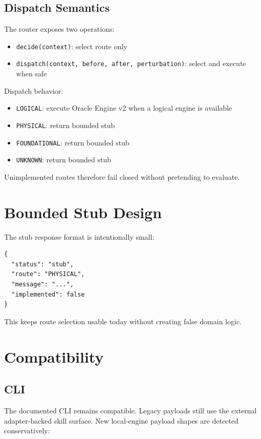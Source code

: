 \documentclass[11pt]{article}
\begin{document}
\subsection{Dispatch Semantics}

The router exposes two operations:

\begin{itemize}
\item \texttt{decide(context)}: select route only
\item \texttt{dispatch(context, before, after, perturbation)}: select and execute when safe
\end{itemize}

Dispatch behavior:

\begin{itemize}
\item \texttt{LOGICAL}: execute Oracle Engine v2 when a logical engine is available
\item \texttt{PHYSICAL}: return bounded stub
\item \texttt{FOUNDATIONAL}: return bounded stub
\item \texttt{UNKNOWN}: return bounded stub
\end{itemize}

Unimplemented routes therefore fail closed without pretending to evaluate.

\section{Bounded Stub Design}

The stub response format is intentionally small:

\begin{verbatim}
{
  "status": "stub",
  "route": "PHYSICAL",
  "message": "...",
  "implemented": false
}
\end{verbatim}

This keeps route selection usable today without creating false domain logic.

\section{Compatibility}

\subsection{CLI}

The documented CLI remains compatible.
Legacy payloads still use the external adapter-backed skill surface.
New local-engine payload shapes are detected conservatively:
\end{document}
